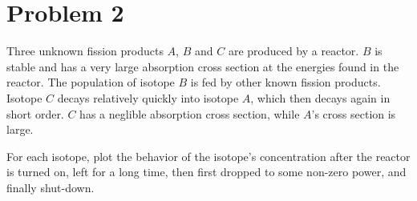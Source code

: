\section*{Problem 2}

Three unknown fission products $A$, $B$ and $C$ are produced by a reactor. 
$B$ is stable and has a very large absorption cross section at the energies found in the reactor. 
The population of isotope $B$ is fed by other known fission products. 
Isotope $C$ decays relatively quickly into isotope $A$, which then decays again in short order. 
$C$ has a neglible absorption cross section, while $A$'s cross section is large. 

For each isotope, plot the behavior of the isotope's concentration after the reactor is turned on, left for a long time, then first dropped to some non-zero power, and finally shut-down.

